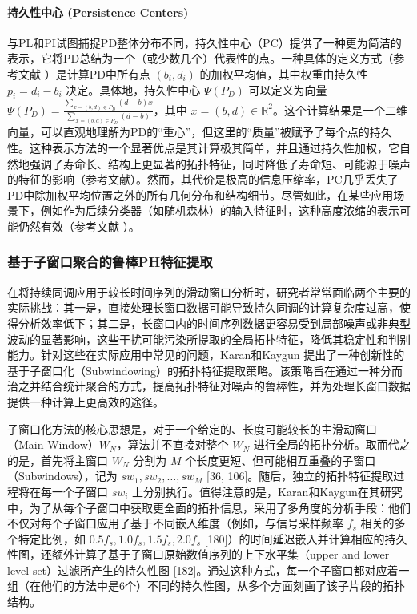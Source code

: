             \paragraph{持久性中心 (Persistence Centers)}
                \label{sec:feat_pcen}
                与PL和PI试图捕捉PD整体分布不同，持久性中心（PC）提供了一种更为简洁的表示，它将PD总结为一个（或少数几个）代表性的点。一种具体的定义方式（参考文献 ）是计算PD中所有点 $(b_i, d_i)$ 的加权平均值，其中权重由持久性 $p_i = d_i - b_i$ 决定。具体地，持久性中心 $\Psi(P_D)$ 可以定义为向量 $\Psi(P_D) = \frac{\sum_{x=(b,d) \in P_D} (d-b) x}{\sum_{x=(b,d) \in P_D} (d-b)}$，其中 $x = (b, d) \in \mathbb{R}^2$。这个计算结果是一个二维向量，可以直观地理解为PD的“重心”，但这里的“质量”被赋予了每个点的持久性。这种表示方法的一个显著优点是其计算极其简单，并且通过持久性加权，它自然地强调了寿命长、结构上更显著的拓扑特征，同时降低了寿命短、可能源于噪声的特征的影响（参考文献）。然而，其代价是极高的信息压缩率，PC几乎丢失了PD中除加权平均位置之外的所有几何分布和结构细节。尽管如此，在某些应用场景下，例如作为后续分类器（如随机森林）的输入特征时，这种高度浓缩的表示可能仍然有效（参考文献 ）。

        \subsubsection{基于子窗口聚合的鲁棒PH特征提取}
        在将持续同调应用于较长时间序列的滑动窗口分析时，研究者常常面临两个主要的实际挑战：其一是，直接处理长窗口数据可能导致持久同调的计算复杂度过高，使得分析效率低下；其二是，长窗口内的时间序列数据更容易受到局部噪声或非典型波动的显著影响，这些干扰可能污染所提取的全局拓扑特征，降低其稳定性和判别能力。针对这些在实际应用中常见的问题，Karan和Kaygun \cite{3} 提出了一种创新性的基于子窗口化（Subwindowing）的拓扑特征提取策略。该策略旨在通过一种分而治之并结合统计聚合的方式，提高拓扑特征对噪声的鲁棒性，并为处理长窗口数据提供一种计算上更高效的途径。

        子窗口化方法的核心思想是，对于一个给定的、长度可能较长的主滑动窗口（Main Window）$W_N$，算法并不直接对整个 $W_N$ 进行全局的拓扑分析。取而代之的是，首先将主窗口 $W_N$ 分割为 $M$ 个长度更短、但可能相互重叠的子窗口（Subwindows），记为 $sw_1, sw_2, \dots, sw_M$ [36, 106]。随后，独立的拓扑特征提取过程将在每一个子窗口 $sw_i$ 上分别执行。值得注意的是，Karan和Kaygun在其研究中，为了从每个子窗口中获取更全面的拓扑信息，采用了多角度的分析手段：他们不仅对每个子窗口应用了基于不同嵌入维度（例如，与信号采样频率 $f_s$ 相关的多个特定比例，如 $0.5f_s, 1.0f_s, 1.5f_s, 2.0f_s$ [180]）的时间延迟嵌入并计算相应的持久性图，还额外计算了基于子窗口原始数值序列的上下水平集（upper and lower level set）过滤所产生的持久性图 [182]。通过这种方式，每一个子窗口都对应着一组（在他们的方法中是6个）不同的持久性图，从多个方面刻画了该子片段的拓扑结构。
        
